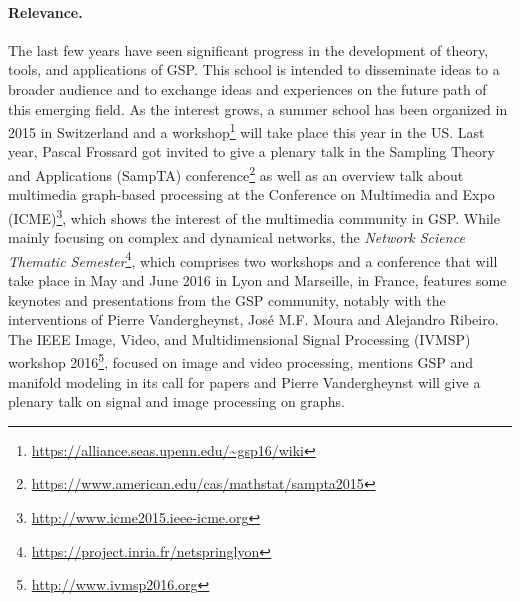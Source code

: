 \documentclass[a4paper]{scrartcl}
\begin{document}
\paragraph{Relevance.}
The last few years have seen significant progress in the development of theory,
tools, and applications of GSP. This school is intended to disseminate ideas to
a broader audience and to exchange ideas and experiences on the future path of
this emerging field. As the interest grows, a summer school has been organized
in 2015 in Switzerland and a
workshop\footnote{\url{https://alliance.seas.upenn.edu/~gsp16/wiki}} will take
place this year in the US. Last year, Pascal Frossard got invited to give a
plenary talk in the Sampling Theory and Applications (SampTA)
conference\footnote{\url{https://www.american.edu/cas/mathstat/sampta2015}} as
well as an overview talk about multimedia graph-based processing at the
Conference on Multimedia and Expo
(ICME)\footnote{\url{http://www.icme2015.ieee-icme.org}}, which shows the
interest of the multimedia community in GSP. While mainly focusing on complex
and dynamical networks, the \textit{Network Science Thematic
Semester}\footnote{\url{https://project.inria.fr/netspringlyon}}, which
comprises two workshops and a conference that will take place in May and June
2016 in Lyon and Marseille, in France, features some keynotes and presentations
from the GSP community, notably with the interventions of Pierre Vandergheynst,
José M.F. Moura and Alejandro Ribeiro. The IEEE Image, Video, and
Multidimensional Signal Processing (IVMSP) workshop
2016\footnote{\url{http://www.ivmsp2016.org}}, focused on image and video
processing, mentions GSP and manifold modeling in its call for papers and
Pierre Vandergheynst will give a plenary talk on signal and image processing on
graphs.

\end{document}
